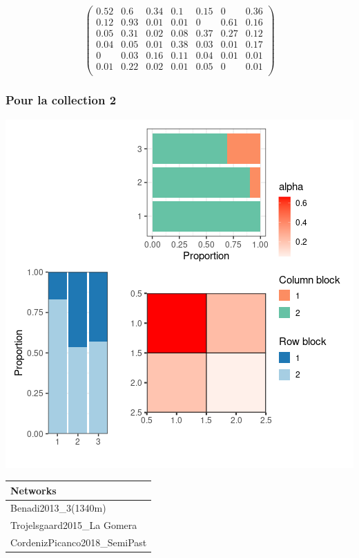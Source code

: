 \normalsize\newline\[\begin{pmatrix} 0.52 &0.6 &0.34 &0.1 &0.15 &0 &0.36 \\0.12 &0.93 &0.01 &0.01 &0 &0.61 &0.16 \\0.05 &0.31 &0.02 &0.08 &0.37 &0.27 &0.12 \\0.04 &0.05 &0.01 &0.38 &0.03 &0.01 &0.17 \\0 &0.03 &0.16 &0.11 &0.04 &0.01 &0.01 \\0.01 &0.22 &0.02 &0.01 &0.05 &0 &0.01 \\ \end{pmatrix}\]

\subsubsection{Pour la collection 2 }

\includegraphics{./img/9a6b30dad9046620bd49013adaef8960862792a2.png}\newline \tiny

\begin{tabular}{l}
\toprule
Networks\\
\midrule
Benadi2013\_3(1340m)\\
Trojelsgaard2015\_La Gomera\\
CordenizPicanco2018\_SemiPast\\
\bottomrule
\end{tabular}

